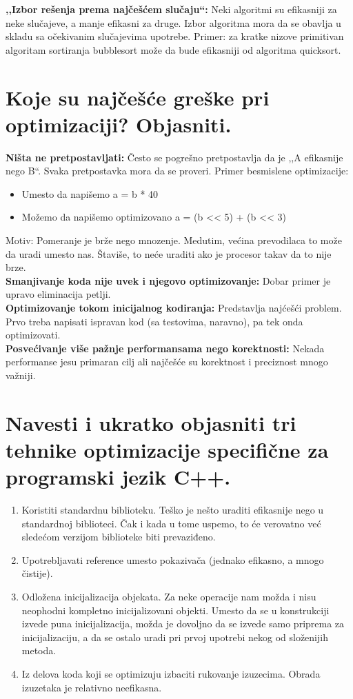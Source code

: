 \documentclass[a4paper]{article}
\begin{document}
  \textbf{,,Izbor rešenja prema najčešćem slučaju``:} Neki algoritmi su efikasniji za neke slučajeve, 
  a manje efikasni za druge. Izbor algoritma mora da se obavlja u skladu sa očekivanim slučajevima 
  upotrebe. Primer: za kratke nizove primitivan algoritam sortiranja bubblesort može da bude 
  efikasniji od algoritma quicksort.
  
\section{Koje su najčešće greške pri optimizaciji? Objasniti.}
  \textbf{Ništa ne pretpostavljati:} Često se pogrešno pretpostavlja da je ,,A efikasnije nego B``. 
  Svaka pretpostavka mora da se proveri. Primer besmislene optimizacije:
  \begin{itemize}
    \item Umesto da napišemo a = b * 40
    \item Možemo da napišemo optimizovano a = (b << 5) + (b << 3)
  \end{itemize}
  Motiv: Pomeranje je brže nego mnozenje. Medutim, većina prevodilaca to može da uradi umesto nas.
  Štaviše, to neće uraditi ako je procesor takav da to nije brze.\\
  
  \textbf{Smanjivanje koda nije uvek i njegovo optimizovanje:} Dobar primer je upravo 
  eliminacija petlji. \\
  
  \textbf{Optimizovanje tokom inicijalnog kodiranja:} Predstavlja najćešći problem. 
  Prvo treba napisati ispravan kod (sa testovima, naravno), pa tek onda optimizovati.\\
  
  \textbf{Posvećivanje više pažnje performansama nego korektnosti:} Nekada performanse jesu 
  primaran cilj ali najčešće su korektnost i preciznost mnogo važniji.
  
\section{Navesti i ukratko objasniti tri tehnike optimizacije specifične za programski jezik C++.}
  \begin{enumerate}
    \item Koristiti standardnu biblioteku. Teško je nešto uraditi efikasnije nego u standardnoj 
          biblioteci. Čak i kada u tome uspemo, to će verovatno već sledećom verzijom biblioteke 
          biti prevaziđeno.
    \item Upotrebljavati reference umesto pokazivača (jednako efikasno, a mnogo čistije).
    \item Odložena inicijalizacija objekata. Za neke operacije nam možda i nisu neophodni kompletno 
          inicijalizovani objekti. Umesto da se u konstrukciji izvede puna inicijalizacija, 
          možda je dovoljno da se izvede samo priprema za inicijalizaciju, a da se ostalo uradi pri 
          prvoj upotrebi nekog od složenijih metoda.
    \item Iz delova koda koji se optimizuju izbaciti rukovanje izuzecima. Obrada izuzetaka je 
          relativno neefikasna.
  \end{enumerate}
\end{document}
